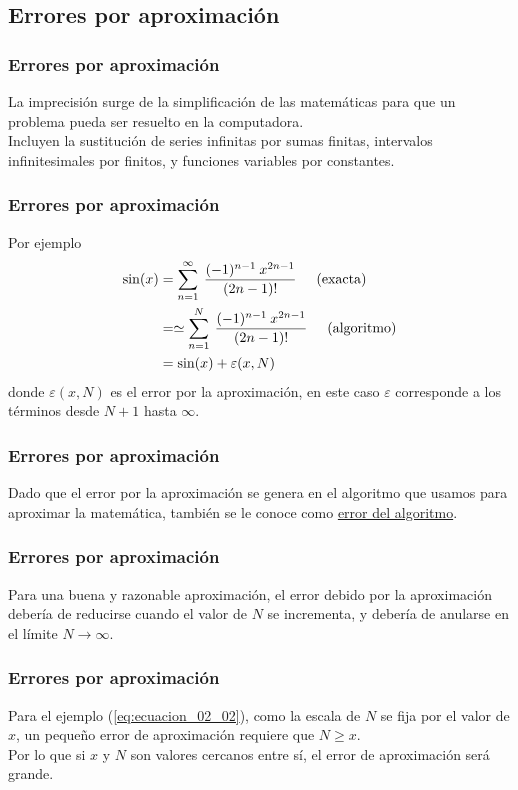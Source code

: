 \subsection{Errores por aproximación}
\begin{frame}
\frametitle{Errores por aproximación}
La imprecisión surge de la simplificación de las matemáticas para que un problema pueda ser resuelto en la computadora.
\\
\bigskip
Incluyen la sustitución de series infinitas por sumas finitas, intervalos infinitesimales por finitos, y funciones variables por constantes.
\end{frame}
\begin{frame}
\frametitle{Errores por aproximación}
Por ejemplo
\begin{align}
\begin{aligned}
\sin(x) &= \sum_{n = 1}^{\infty} \: \dfrac{(-1)^{n-1} \: x^{2n - 1}}{(2n - 1)!} \hspace{0.5cm} \mbox{(exacta)} \\
&= \simeq \sum_{n = 1}^{N} \: \dfrac{(-1)^{n-1} \: x^{2n - 1}}{(2n - 1)!} \hspace{0.5cm} \mbox{(algoritmo)} \\
& = \sin(x) + \varepsilon(x, N)
\end{aligned}
\label{eq:ecuacion_02_02}
\end{align}
donde $\varepsilon(x,N)$ es el error por la aproximación, en este caso $\varepsilon$ corresponde a los términos desde $N+1$ hasta $\infty$.
\end{frame}
\begin{frame}
\frametitle{Errores por aproximación}
Dado que el error por la aproximación se genera en el algoritmo que usamos para aproximar la matemática, también se le conoce como \underline{error del algoritmo}.
\end{frame}
\begin{frame}
\frametitle{Errores por aproximación}
Para una buena y razonable aproximación, el error debido por la aproximación debería de reducirse cuando el valor de $N$ se incrementa, y debería de anularse en el límite $N \rightarrow \infty$.
\end{frame}
\begin{frame}
\frametitle{Errores por aproximación}
Para el ejemplo (\ref{eq:ecuacion_02_02}), como la escala de $N$ se fija por el valor de $x$, un pequeño error de aproximación requiere que $ N \geqslant x$.
\\
\bigskip
Por lo que si $x$ y $N$ son valores cercanos entre sí, el error de aproximación será grande.
\end{frame}

